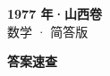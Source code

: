 \documentclass[zihao=-4, a4paper]{ctexart}
\begin{document}
\begin{center}
  {\Large\bfseries 1977 年·山西卷}\\[4pt]
  {\large 数学 · 简答版}
\end{center}
\medskip
{}

\clearpage
{}
\begin{center}{\Large\bfseries 答案速查}\end{center}
\medskip

\end{document}
